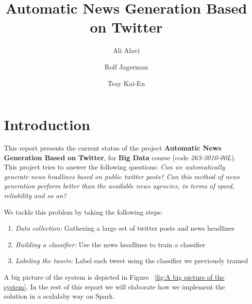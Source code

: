 \documentclass{llncs}
\begin{document}
%
\mainmatter              %
\pagestyle{headings}

%
\title{Automatic News Generation Based on Twitter}
%
%
\author{Ali Alavi \and Rolf Jagerman \and
Tsay Kai-En}
%
%
%

\maketitle              %
%

\section{Introduction}
This report presents the current status of the project \textbf{Automatic News Generation Based on Twitter}, for \textbf{Big Data} course (code \textit{263-3010-00L}). This project tries to answer the following questions: 
\textit{Can we automatically generate news headlines based on public twitter posts? Can this method of news generation perform better than the available news agencies, in terms of speed, reliability and so on?}

We tackle this problem by taking the following steps:

\begin{enumerate}
	\item \textit{Data collection: }Gathering a large set of twitter posts and news headlines 
	\item \textit{Building a classifier: }Use the news headlines to train a classifier
	\item \textit{Labeling the tweets: }Label each tweet using the classifier we previously trained
\end{enumerate}

A big picture of the system is depicted in Figure ~\ref{fig:A big picture of the system}. In the rest of this report we will elaborate how we implement the solution in a scalalaby way on Spark. 
\end{document}
